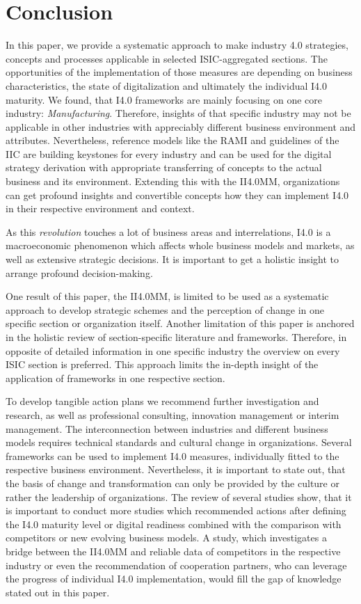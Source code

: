 \section{Conclusion}

In this paper, we provide a systematic approach to make industry 4.0 strategies, concepts and processes applicable in selected \ac{ISIC}-aggregated sections. The opportunities of the implementation of those measures are depending on business characteristics, the state of digitalization and ultimately the individual \ac{I4.0} maturity. We found, that \ac{I4.0} frameworks are mainly focusing on one core industry: \emph{Manufacturing}. Therefore, insights of that specific industry may not be applicable in other industries with appreciably different business environment and attributes. Nevertheless, reference models like the \ac{RAMI} and guidelines of the \ac{IIC} are building keystones for every industry and can be used for the digital strategy derivation with appropriate transferring of concepts to the actual business and its environment. Extending this with the \ac{II4.0MM}, organizations can get profound insights and convertible concepts how they can implement \ac{I4.0} in their respective environment and context.

As this \emph{revolution} touches a lot of business areas and interrelations, \ac{I4.0} is a macroeconomic phenomenon which affects whole business models and markets, as well as extensive strategic decisions. It is important to get a holistic insight to arrange profound decision-making.

One result of this paper, the \ac{II4.0MM}, is limited to be used as a systematic approach to develop strategic schemes and the perception of change in one specific section or organization itself. Another limitation of this paper is anchored in the holistic review of section-specific literature and frameworks. Therefore, in opposite of detailed information in one specific industry the overview on every \ac{ISIC} section is preferred. This approach limits the in-depth insight of the application of frameworks in one respective section.

To develop tangible action plans we recommend further investigation and research, as well as professional consulting, innovation management or interim management. The interconnection between industries and different business models requires technical standards and cultural change in organizations. Several frameworks can be used to implement \ac{I4.0} measures, individually fitted to the respective business environment. Nevertheless, it is important to state out, that the basis of change and transformation can only be provided by the culture or rather the leadership of organizations. The review of several studies show, that it is important to conduct more studies which recommended actions after defining the \ac{I4.0} maturity level or digital readiness combined with the comparison with competitors or new evolving business models. A study, which investigates a bridge between the \ac{II4.0MM} and reliable data of competitors in the respective industry or even the recommendation of cooperation partners, who can leverage the progress of individual \ac{I4.0} implementation, would fill the gap of knowledge stated out in this paper.

